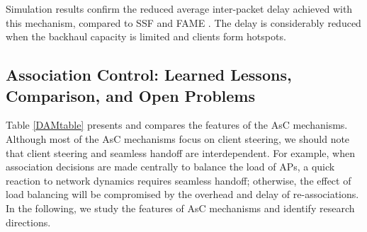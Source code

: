 Simulation results confirm the reduced average inter-packet delay achieved with this mechanism, compared to SSF and FAME \cite{802.11n-AP-Association-2014}. 
The delay is considerably reduced when the backhaul capacity is limited and clients form hotspots.







\subsection{Association Control: Learned Lessons, Comparison, and Open Problems}
\label{AscProblems}
Table \ref{DAMtable} presents and compares the features of the AsC mechanisms.
Although most of the AsC mechanisms focus on client steering, we should note that client steering and seamless handoff are interdependent.
For example, when association decisions are made centrally to balance the load of APs, a quick reaction to network dynamics requires seamless handoff; otherwise, the effect of load balancing will be compromised by the overhead and delay of re-associations.
In the following, we study the features of AsC mechanisms and identify research directions.




